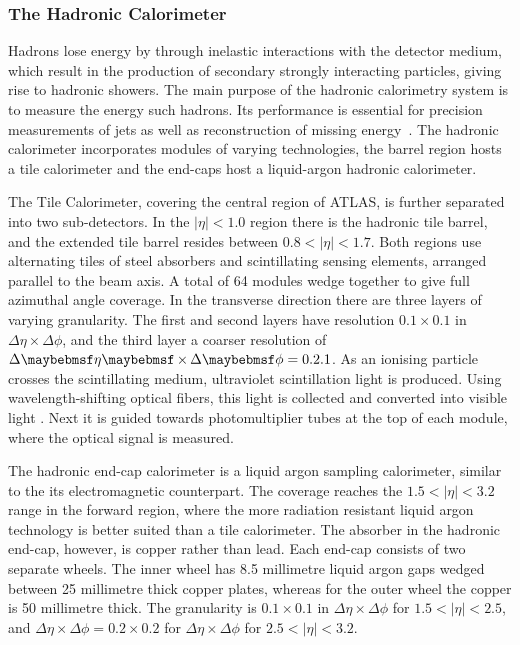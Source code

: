 \subsubsection{The Hadronic Calorimeter}
Hadrons lose energy by through inelastic interactions with the detector medium, which result in the production of secondary strongly interacting particles, giving rise to hadronic showers. The main purpose of the hadronic calorimetry system is to measure the energy such hadrons. Its performance is essential for precision measurements of jets as well as reconstruction of missing energy~\cite{Aaboud:2018scw}. The hadronic calorimeter incorporates modules of varying technologies, the barrel region hosts a tile calorimeter and the end-caps host a liquid-argon hadronic calorimeter. 

The Tile Calorimeter, covering the central region of ATLAS, is further separated into two sub-detectors. In the $|\eta| < 1.0$ region there is the hadronic tile barrel, and the extended tile barrel resides between $0.8 < |\eta| < 1.7$. Both regions use alternating tiles of steel absorbers and scintillating sensing elements, arranged parallel to the beam axis. A total of 64 modules wedge together to give full azimuthal angle coverage. In the transverse direction there are three layers of varying granularity. The first and second layers have resolution $0.1 \times 0.1$ in $\Delta\eta\times\Delta\phi$, and the third layer a coarser resolution of $\Delta\eta\times\Delta\phi = 0.2 \time 0.1$. As an ionising particle crosses the scintillating medium, ultraviolet scintillation light is produced. Using wavelength-shifting optical fibers, this light is collected and converted into visible light . Next it is guided towards photomultiplier tubes at the top of each module, where the optical signal is measured.

The hadronic end-cap calorimeter is a liquid argon sampling calorimeter, similar to the its electromagnetic counterpart. The coverage reaches the $1.5 < |\eta| < 3.2$ range in the forward region, where the more radiation resistant liquid argon technology is better suited than a tile calorimeter. The absorber in the hadronic end-cap, however, is copper rather than lead. Each end-cap consists of two separate wheels. The inner wheel has 8.5 millimetre liquid argon gaps wedged between 25 millimetre thick copper plates, whereas for the outer wheel the copper is 50 millimetre thick. The granularity is $0.1 \times 0.1$ in $\Delta\eta\times\Delta\phi$ for $1.5 < |\eta| < 2.5$, and $\Delta\eta\times\Delta\phi = 0.2 \times 0.2$ for $\Delta\eta\times\Delta\phi$ for $2.5 < |\eta| < 3.2$.


